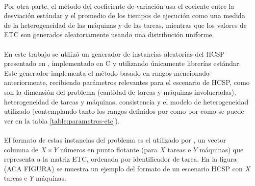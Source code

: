 \begin{table}[h!]
    \centering
    \caption{Parámetros de los modelos ETC}
    \label{table:parametros-etc}
\end{table}

\paragraph{}Por otra parte, el método del coeficiente de variación usa el cociente entre la desviación estándar y el promedio de los tiempos de ejecución como una medida de la heterogeneidad de las máquinas y de las tareas, mientras que los valores de ETC son generados aleatoriamente usando una distribución uniforme.

\paragraph{}En este trabajo se utilizó un generador de instancias aleatorias del HCSP presentado en \citet{bib-doctorado-nesmachnow}, implementado en C y utilizando únicamente librerías estándar. Este generador implementa el método basado en rangos mencionado anteriormente, recibiendo parámetros relevantes para el escenario de HCSP, como son la dimensión del problema (cantidad de tareas y máquinas involucradas), heterogeneidad de tareas y máquinas, consistencia y el modelo de heterogeneidad utilizado (contemplando tanto los rangos definidos por \citet{bib-ali-hc-etc} como por \citet{bib-braun} como se puede ver en la tabla \ref{table:parametros-etc}).

\paragraph{}El formato de estas instancias del problema es el utilizado por \citet{bib-braun}, un vector columna de $X \times Y$ números en punto flotante (para $X$ tareas e $Y$ máquinas) que representa a la matriz ETC, ordenada por identificador de tarea. En la figura (ACA FIGURA) se muestra un ejemplo del formato de un escenario HCSP con $X$ tareas e $Y$ máquinas.

